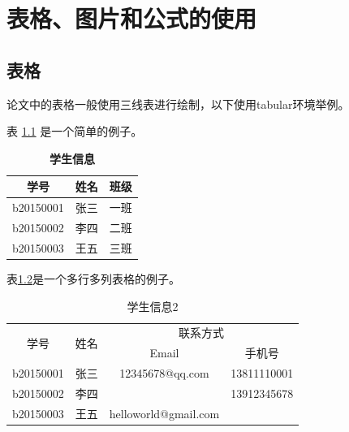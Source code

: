 
\chapter{表格、图片和公式的使用}
\section{表格}
论文中的表格一般使用三线表进行绘制，以下使用tabular环境举例。\par
表 \ref{student_info} 是一个简单的例子。 \par
\begin{table}
\label{student_info}
\begin{center}
\caption{\textbf{学生信息}}
\begin{tabular}{ccc}
    \toprule
    学号  &   姓名  &   班级\\
    \midrule
    b20150001   &   张三  &   一班\\
    b20150002   &   李四  &   二班\\
    b20150003   &   王五  &   三班\\
    \bottomrule
\end{tabular}
\end{center}
\end{table}

表\ref{student_info2}是一个多行多列表格的例子。 \par
\begin{table}
\caption{学生信息2}
\label{student_info2}
\begin{center}
\begin{tabular}{cccc}
    \hline
    \multirow{2}{*}{学号}  &  \multirow{2}{*}{姓名}  &   \multicolumn{2}{c}{联系方式}\\
        &   &   Email   &   手机号\\
    \hline
    b20150001   &   张三  &   12345678@qq.com &   13811110001\\
    b20150002   &   李四  &       &   13912345678\\
    b20150003   &   王五  &   helloworld@gmail.com    &   \\
    \hline
\end{tabular}
\end{center}
\end{table}


